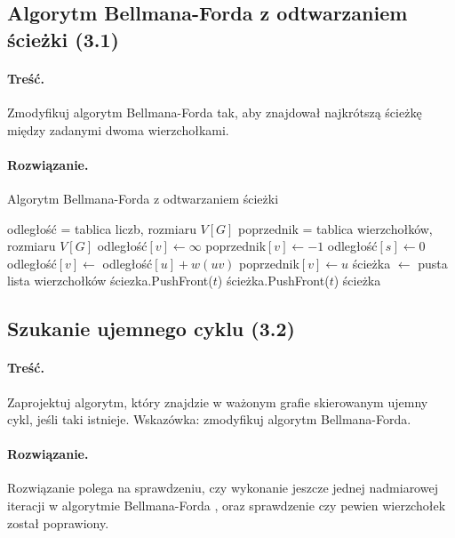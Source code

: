 \subsection{Algorytm Bellmana-Forda z odtwarzaniem ścieżki (3.1)}
\paragraph{Treść.}Zmodyfikuj algorytm Bellmana-Forda tak, 
aby znajdował najkrótszą ścieżkę między zadanymi dwoma
wierzchołkami.

\paragraph{Rozwiązanie.}

\begin{algorithm}[H]
	\caption{Algorytm Bellmana-Forda z odtwarzaniem ścieżki}
	\begin{algorithmic}[1]

		\State odległość = tablica liczb, rozmiaru $V[G]$
		\State poprzednik = tablica wierzchołków, rozmiaru $V[G]$
		\State odległość$[v]\gets\infty$
		\State poprzednik$[v]\gets-1$
		\EndFor
		\State odległość$[s]\gets0$
		\State odległość$[v]\gets$ odległość$[u] + w(uv)$ 
		\State poprzednik$[v]\gets u$
		\EndIf
		\EndFor
		\EndFor
		\State ścieżka $\gets$ pusta lista wierzchołków
		\State ściezka.PushFront($t$)
		\State ścieżka.PushFront($t$)
		\EndWhile
		\State \Return ścieżka
		\EndProcedure
	\end{algorithmic}
	\label{Zadanie31}
\end{algorithm}
\subsection{Szukanie ujemnego cyklu (3.2)}
\paragraph{Treść.}Zaprojektuj algorytm, który znajdzie w 
ważonym grafie skierowanym ujemny cykl, jeśli taki istnieje.
Wskazówka: zmodyfikuj algorytm Bellmana-Forda.

\paragraph{Rozwiązanie.}
Rozwiązanie polega na sprawdzeniu, czy wykonanie
jeszcze jednej nadmiarowej iteracji 
w algorytmie Bellmana-Forda %
, oraz sprawdzenie
czy pewien wierzchołek został poprawiony. %

